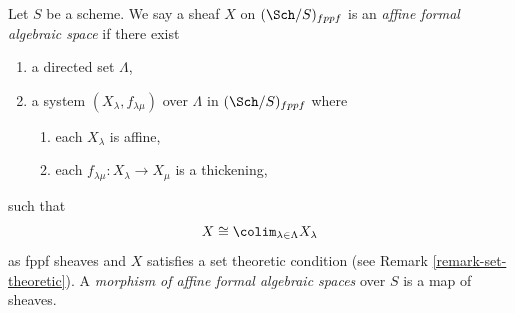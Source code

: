 \begin{definition}
\label{definition-affine-formal-algebraic-space}
Let $S$ be a scheme. We say a sheaf $X$ on $(\Sch/S)_{fppf}$ is an
{\it affine formal algebraic space} if there exist
\begin{enumerate}
\item a directed set $\Lambda$,
\item a system $(X_\lambda, f_{\lambda \mu})$ over $\Lambda$
in $(\Sch/S)_{fppf}$ where
\begin{enumerate}
\item each $X_\lambda$ is affine,
\item each $f_{\lambda \mu} : X_\lambda \to X_\mu$ is a thickening,
\end{enumerate}
\end{enumerate}
such that
$$
X \cong \colim_{\lambda \in \Lambda} X_\lambda
$$
as fppf sheaves and $X$ satisfies a set theoretic condition
(see Remark \ref{remark-set-theoretic}). A
{\it morphism of affine formal algebraic spaces}
over $S$ is a map of sheaves.
\end{definition}